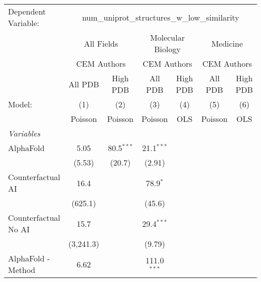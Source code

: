 \begingroup
\centering
\begin{tabular}{lcccccc}
   \tabularnewline \midrule \midrule
   Dependent Variable: & \multicolumn{6}{c}{num\_uniprot\_structures\_w\_low\_similarity}\\
 & \multicolumn{2}{c}{All Fields} & \multicolumn{2}{c}{Molecular Biology} & \multicolumn{2}{c}{Medicine} \\
\cmidrule(lr){2-3} \cmidrule(lr){4-5} \cmidrule(lr){6-7}
 & \multicolumn{2}{c}{CEM Authors} & \multicolumn{2}{c}{CEM Authors} & \multicolumn{2}{c}{CEM Authors} \\
\cmidrule(lr){2-3} \cmidrule(lr){4-5} \cmidrule(lr){6-7}
 & \multicolumn{1}{c}{All PDB} & \multicolumn{1}{c}{High PDB} & \multicolumn{1}{c}{All PDB} & \multicolumn{1}{c}{High PDB} & \multicolumn{1}{c}{All PDB} & \multicolumn{1}{c}{High PDB} \\
\cmidrule(lr){2-2} \cmidrule(lr){3-3} \cmidrule(lr){4-4} \cmidrule(lr){5-5} \cmidrule(lr){6-6} \cmidrule(lr){7-7}
   Model:                                                  & (1)       & (2)          & (3)            & (4)  & (5)     & (6)\\  
                                                           &  Poisson  & Poisson      & Poisson        & OLS  & Poisson & OLS\\  
   \midrule
   \emph{Variables}\\
   AlphaFold                                               & 5.05      & 80.5$^{***}$ & 21.1$^{***}$   &      &         &   \\   
                                                           & (5.53)    & (20.7)       & (2.91)         &      &         &   \\   
   Counterfactual AI                                       & 16.4      &              & 78.9$^{*}$     &      &         &   \\   
                                                           & (625.1)   &              & (45.6)         &      &         &   \\   
   Counterfactual No AI                                    & 15.7      &              & 29.4$^{***}$   &      &         &   \\   
                                                           & (3,241.3) &              & (9.79)         &      &         &   \\   
   AlphaFold - Method                                      & 6.62      &              & 111.0$^{***}$  &      &         &   \\   

\end{tabular}
